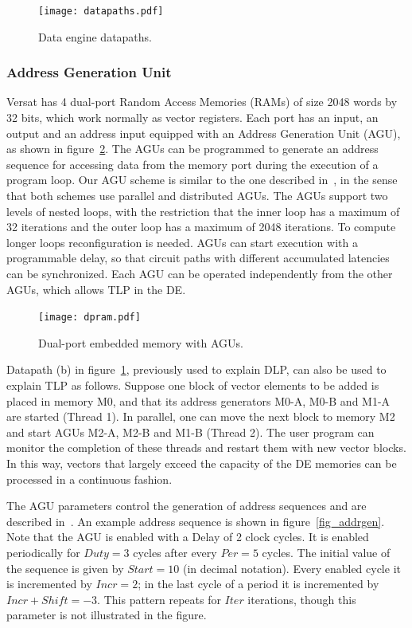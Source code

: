 \documentclass[journal]{IEEEtran}
\begin{document}
\begin{figure}[!h]
\centering
\texttt{[image: datapaths.pdf]}
\caption{Data engine datapaths.}
\label{fig_de_dp}
\end{figure}

\subsubsection{Address Generation Unit}
\label{subsection:addressGenerationUnit}

Versat has 4 dual-port Random Access Memories (RAMs) of size 2048
words by 32 bits, which work normally as vector registers. Each port
has an input, an output and an address input equipped with an Address
Generation Unit (AGU), as shown in figure~\ref{fig_dpram}. The AGUs
can be programmed to generate an address sequence for accessing data
from the memory port during the execution of a program loop. Our AGU
scheme is similar to the one described in~\cite{Farahini14}, in the
sense that both schemes use parallel and distributed AGUs. The AGUs
support two levels of nested loops, with the restriction that the
inner loop has a maximum of 32 iterations and the outer loop has a
maximum of 2048 iterations. To compute longer loops reconfiguration is
needed. AGUs can start execution with a programmable delay, so that
circuit paths with different accumulated latencies can be
synchronized. Each AGU can be operated independently from the other
AGUs, which allows TLP in the DE.

\begin{figure}[!h]
\centering
\texttt{[image: dpram.pdf]}
\caption{Dual-port embedded memory with AGUs.}
\label{fig_dpram}
\end{figure}

Datapath (b) in figure~\ref{fig_de_dp}, previously used to explain
DLP, can also be used to explain TLP as follows. Suppose one block of
vector elements to be added is placed in memory M0, and that its
address generators M0-A, M0-B and M1-A are started (Thread 1). In
parallel, one can move the next block to memory M2 and start AGUs
M2-A, M2-B and M1-B (Thread 2). The user program can monitor the
completion of these threads and restart them with new vector
blocks. In this way, vectors that largely exceed the capacity of the
DE memories can be processed in a continuous fashion.

The AGU parameters control the generation of address sequences and
are described in~\cite{Lopes2017}. An example address sequence is
shown in figure~\ref{fig_addrgen}. Note that the AGU is enabled with a
Delay of 2 clock cycles. It is enabled periodically for $Duty=3$
cycles after every $Per=5$ cycles. The initial value of the sequence
is given by $Start=10$ (in decimal notation). Every enabled cycle it
is incremented by $Incr=2$; in the last cycle of a period it is
incremented by $Incr+Shift=-3$. This pattern repeats for $Iter$
iterations, though this parameter is not illustrated in the figure.
\end{document}
